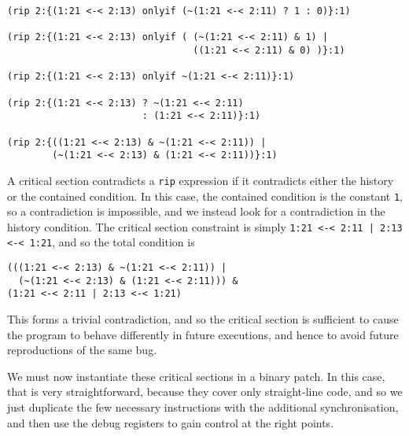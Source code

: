 \documentclass[10pt,a4paper]{report}
\begin{document}
\begin{verbatim}
(rip 2:{(1:21 <-< 2:13) onlyif (~(1:21 <-< 2:11) ? 1 : 0)}:1)

(rip 2:{(1:21 <-< 2:13) onlyif ( (~(1:21 <-< 2:11) & 1) |
                                 ((1:21 <-< 2:11) & 0) )}:1)

(rip 2:{(1:21 <-< 2:13) onlyif ~(1:21 <-< 2:11)}:1)

(rip 2:{(1:21 <-< 2:13) ? ~(1:21 <-< 2:11)
                        : (1:21 <-< 2:11)}:1)

(rip 2:{((1:21 <-< 2:13) & ~(1:21 <-< 2:11)) |
        (~(1:21 <-< 2:13) & (1:21 <-< 2:11))}:1)
\end{verbatim}


A critical section contradicts a \verb|rip| expression if it
contradicts either the history or the contained condition.  In this
case, the contained condition is the constant \verb|1|, so a
contradiction is impossible, and we instead look for a contradiction
in the history condition.  The critical section constraint is simply
\verb^1:21 <-< 2:11 | 2:13 <-< 1:21^, and so the total condition is

\begin{verbatim}
(((1:21 <-< 2:13) & ~(1:21 <-< 2:11)) |
  (~(1:21 <-< 2:13) & (1:21 <-< 2:11))) &
(1:21 <-< 2:11 | 2:13 <-< 1:21)
\end{verbatim}

This forms a trivial contradiction, and so the critical section is
sufficient to cause the program to behave differently in future
executions, and hence to avoid future reproductions of the same bug.

We must now instantiate these critical sections in a binary patch.  In
this case, that is very straightforward, because they cover only
straight-line code, and so we just duplicate the few necessary
instructions with the additional synchronisation, and then use the
debug registers to gain control at the right points.

\end{document}

